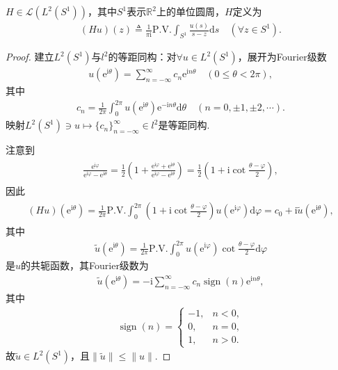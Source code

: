 \documentclass[../../main.tex]{subfiles}%
\begin{document}
\begin{proposition}
$H\in\mathscr{L}(L^2(S^1))$，其中$S^1$表示$\mathbb{R}^2$上的单位圆周，$H$定义为
\begin{align*}
(Hu)(z)\triangleq\frac{1}{\pi\mathrm{i}}\text{P.V.}\int_{S^1}\frac{u(s)}{s-z}\mathrm{d}s\quad (\forall z\in S^1).
\end{align*}
\end{proposition}

\begin{proof}

建立$L^2(S^1)$与$l^2$的等距同构：对$\forall u\in L^2(S^1)$，展开为Fourier级数
\begin{align*}
u(\mathrm{e}^{\mathrm{i}\theta})=\sum\limits_{n=-\infty}^{\infty}c_n\mathrm{e}^{\mathrm{i}n\theta}\quad (0\leqslant\theta<2\pi),
\end{align*}
其中
\begin{align*}
c_n=\frac{1}{2\pi}\int_{0}^{2\pi}u(\mathrm{e}^{\mathrm{i}\theta})\mathrm{e}^{-\mathrm{i}n\theta}\mathrm{d}\theta\quad (n=0,\pm1,\pm2,\cdots).
\end{align*}
映射$L^2(S^1)\ni u\mapsto\{c_n\}_{n=-\infty}^{\infty}\in l^2$是等距同构.

注意到
\begin{align*}
\begin{aligned}
\frac{\mathrm{e}^{\mathrm{i}\varphi}}{\mathrm{e}^{\mathrm{i}\varphi}-\mathrm{e}^{\mathrm{i}\theta}}=\frac{1}{2}\left(1+\frac{\mathrm{e}^{\mathrm{i}\varphi}+\mathrm{e}^{\mathrm{i}\theta}}{\mathrm{e}^{\mathrm{i}\varphi}-\mathrm{e}^{\mathrm{i}\theta}}\right)
=\frac{1}{2}\left(1+\mathrm{i}\cot\frac{\theta-\varphi}{2}\right),
\end{aligned}
\end{align*}
因此
\begin{align*}
\begin{aligned}
(Hu)(\mathrm{e}^{\mathrm{i}\theta})=\frac{1}{2\pi}\text{P.V.}\int_{0}^{2\pi}\left(1+\mathrm{i}\cot\frac{\theta-\varphi}{2}\right)u(\mathrm{e}^{\mathrm{i}\varphi})\mathrm{d}\varphi
=c_0+\mathrm{i}\widetilde{u}(\mathrm{e}^{\mathrm{i}\theta}),
\end{aligned}
\end{align*}
其中
\begin{align*}
\widetilde{u}(\mathrm{e}^{\mathrm{i}\theta})=\frac{1}{2\pi}\text{P.V.}\int_{0}^{2\pi}u(\mathrm{e}^{\mathrm{i}\varphi})\cot\frac{\theta-\varphi}{2}\mathrm{d}\varphi
\end{align*}
是$u$的共轭函数，其Fourier级数为
\begin{align*}
\widetilde{u}(\mathrm{e}^{\mathrm{i}\theta})=-\mathrm{i}\sum\limits_{n=-\infty}^{\infty}c_n\operatorname{sign}(n)\mathrm{e}^{\mathrm{i}n\theta},
\end{align*}
其中
\begin{align*}
\operatorname{sign}(n)=
\begin{cases}
-1,&n<0,\\
0,&n=0,\\
1,&n>0.
\end{cases}
\end{align*}
故$\widetilde{u}\in L^2(S^1)$，且$\|\widetilde{u}\|\leqslant\|u\|$.


\end{proof}
\end{document}
